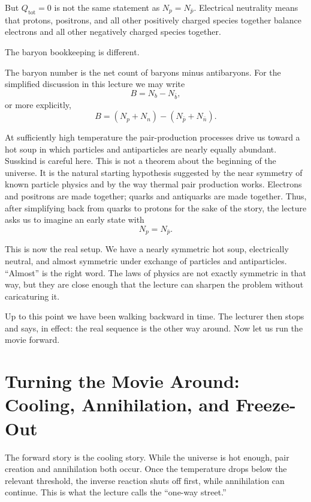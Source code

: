 But \(Q_{\mathrm{tot}}=0\) is not the same statement as \(N_p=N_{\bar p}\). Electrical neutrality means that protons, positrons, and all other positively charged species together balance electrons and all other negatively charged species together.

The baryon bookkeeping is different.

\begin{definition}
The baryon number is the net count of baryons minus antibaryons. For the simplified discussion in this lecture we may write
\begin{equation}
B = N_b - N_{\bar b},
\end{equation}
or more explicitly,
\begin{equation}
B=(N_p+N_n)-(N_{\bar p}+N_{\bar n}).
\end{equation}
\end{definition}

At sufficiently high temperature the pair-production processes drive us toward a hot soup in which particles and antiparticles are nearly equally abundant. Susskind is careful here. This is not a theorem about the beginning of the universe. It is the natural starting hypothesis suggested by the near symmetry of known particle physics and by the way thermal pair production works. Electrons and positrons are made together; quarks and antiquarks are made together. Thus, after simplifying back from quarks to protons for the sake of the story, the lecture asks us to imagine an early state with
\begin{equation}
N_p = N_{\bar p}.
\end{equation}

This is now the real setup. We have a nearly symmetric hot soup, electrically neutral, and almost symmetric under exchange of particles and antiparticles. ``Almost'' is the right word. The laws of physics are not exactly symmetric in that way, but they are close enough that the lecture can sharpen the problem without caricaturing it.

Up to this point we have been walking backward in time. The lecturer then stops and says, in effect: the real sequence is the other way around. Now let us run the movie forward.

\section{Turning the Movie Around: Cooling, Annihilation, and Freeze-Out}

The forward story is the cooling story. While the universe is hot enough, pair creation and annihilation both occur. Once the temperature drops below the relevant threshold, the inverse reaction shuts off first, while annihilation can continue. This is what the lecture calls the ``one-way street.''

